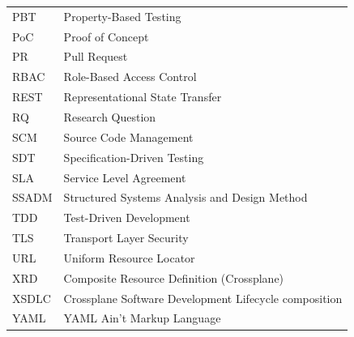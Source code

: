 \begin{longtable}{@{} l p{} @{}}
PBT     & Property-Based Testing \\
PoC     & Proof of Concept \\
PR      & Pull Request \\
RBAC    & Role-Based Access Control \\
REST    & Representational State Transfer \\
RQ      & Research Question \\
SCM     & Source Code Management \\
SDT     & Specification-Driven Testing \\
SLA     & Service Level Agreement \\
SSADM   & Structured Systems Analysis and Design Method \\
TDD     & Test-Driven Development \\
TLS     & Transport Layer Security \\
URL     & Uniform Resource Locator \\
XRD     & Composite Resource Definition (Crossplane) \\
XSDLC   & Crossplane Software Development Lifecycle composition \\
YAML    & YAML Ain't Markup Language \\
\end{longtable}

\clearpage
